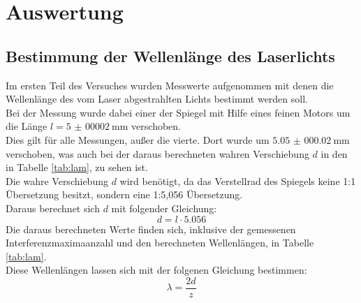\newpage
\section{Auswertung}

\subsection{Bestimmung der Wellenlänge des Laserlichts}

\noindent Im ersten Teil des Versuches wurden Messwerte aufgenommen mit denen die Wellenlänge des vom Laser abgestrahlten Lichts bestimmt werden soll.\\
Bei der Messung wurde dabei einer der Spiegel mit Hilfe eines feinen Motors um die Länge $l=\SI{5(00002)}{\milli\metre}$ verschoben.\\
Dies gilt für alle Messungen, außer die vierte. Dort wurde um $\SI{5.05(00002)}{\milli\metre}$ verschoben, was auch bei der daraus berechneten wahren Verschiebung $d$ in den in Tabelle \ref{tab:lam}, zu sehen ist.\\
Die wahre Verschiebung $d$ wird benötigt, da das Verstellrad des Spiegels keine 1:1 Übersetzung besitzt, sondern eine 1:5,056 Übersetzung.\\
Daraus berechnet sich $d$ mit folgender Gleichung:
\begin{equation*}
    d=l \cdot 5.056
\end{equation*}
\noindent
Die daraus berechneten Werte finden sich, inklusive der gemessenen Interferenzmaximaanzahl und den berechneten Wellenlängen, in Tabelle \ref{tab:lam}.\\
Diese Wellenlängen lassen sich mit der folgenen Gleichung bestimmen:
\begin{equation*}
    \lambda=\frac{2d}{z}
\end{equation*}



